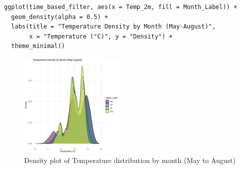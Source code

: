 \begin{verbatim}
ggplot(time_based_filter, aes(x = Temp_2m, fill = Month_Label)) +
  geom_density(alpha = 0.5) +
  labs(title = "Temperature Density by Month (May-August)",
       x = "Temperature (°C)", y = "Density") +
  theme_minimal()
\end{verbatim}

\begin{figure}[h]
    \centering
    \includegraphics[width=0.45\textwidth]{figures/density_time.jpg}
    \caption{Density plot of Temperature distribution by month (May to August)}
    \label{fig:temp_density}
\end{figure}
